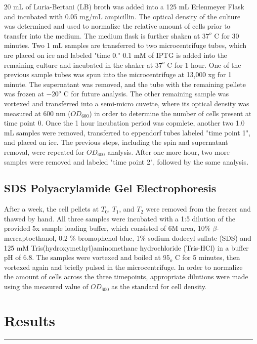 \documentclass[12pt, letterpaper]{article}
\begin{document}
20 mL of Luria-Bertani (LB) broth was added into a 125 mL Erlenmeyer Flask and incubated with 0.05 mg/mL 
ampicillin. The optical density of the culture was determined and used to normalize the relative amount of cells 
prior to transfer into the medium. The medium flask is further shaken at $37^o$ C for 30 minutes. Two 1 mL samples 
are transferred to two microcentrifuge tubes, which are placed on ice and labeled "time 0." 0.1 mM of IPTG is added 
into the remaining culture and incubated in the shaker at $37^o$ C for 1 hour. One of the previous sample tubes was 
spun into the microcentrifuge at 13,000 xg for 1 minute. The supernatant was removed, and the tube with the remaining
pellete was frozen at $-20^o$ C for future analysis. The other remaining sample was vortexed and transferred into a 
semi-micro cuvette, where its optical density was measured at 600 nm ($OD_{600}$) in order to determine the number of cells
present at time point 0. Once the 1 hour incubation period was copmlete, another two 1.0 mL samples were removed, 
transferred to eppendorf tubes labeled "time point 1", and placed on ice. The previous steps, including the spin and 
supernatant removal, were repeated for $OD_{600}$ analysis. After one more hour, two more samples were removed and labeled
"time point 2", followed by the same analysis. 

\subsection{SDS Polyacrylamide Gel Electrophoresis}

After a week, the cell pellets at $T_0$, $T_1$, and $T_2$ were removed from the freezer and thawed by hand. All three samples
were incubated with a 1:5 dilution of the provided 5x sample loading buffer, which consisted of 6M urea, 10\% $\beta$-mercaptoethanol,
0.2 \% bromophenol blue, 1\% sodium dodecyl suflate (SDS) and 125 mM Tris(hydroxymethyl)aminomethane hydrochloride (Tris-HCl) in a 
buffer pH of 6.8. The samples were vortexed and boiled at $95_o$ C for 5 minutes, then vortexed again and briefly pulsed in the microcentrifuge. 
In order to normalize the amount of cells across the three timepoints, appropriate dilutions were made using the measured value of $OD_{600}$ as the 
standard for cell density. 

\section{Results}
\rule{\textwidth}{0.5pt}
\end{document}
